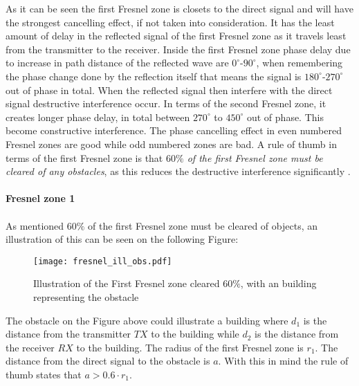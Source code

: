As it can be seen the first Fresnel zone is closets to the direct signal and will have the strongest cancelling effect, if not taken into consideration. It has the least amount of delay in the reflected signal of the first Fresnel zone as it travels least from the transmitter to the receiver. Inside the first Fresnel zone phase delay due to increase in path distance of the reflected wave are $0^\circ$-$90^\circ$, when remembering the phase change done by the reflection itself that means the signal is $180^\circ$-$270^\circ$ out of phase in total. When the reflected signal then interfere with the direct signal destructive interference occur. In terms of the second Fresnel zone, it creates longer phase delay, in total between $270^\circ$ to $450^\circ$ out of phase. This become constructive interference. The phase cancelling effect in even numbered Fresnel zones are good while odd numbered zones are bad. A rule of thumb in terms of the first Fresnel zone is that \textit{$60\%$ of the first Fresnel zone must be cleared of any obstacles}, as this reduces the destructive interference significantly \citep{introRF}\citep{Fres2}. 
\\
\\


\textbf{Fresnel zone 1}
\\
\\
As mentioned $60\%$ of the first Fresnel zone must be cleared of objects, an illustration of this can be seen on the following Figure:
\begin{figure}[H]
\centering
\texttt{[image: fresnel\_ill\_obs.pdf]}
\caption{Illustration of the First Fresnel zone cleared $60\%$, with an building representing the obstacle}
\label{dijdk1}
\end{figure}


The obstacle on the Figure above could illustrate a building where $d_{1}$ is the distance from the transmitter $TX$ to the building while $d_{2}$ is the distance from the receiver $RX$ to the building. The radius of the first Fresnel zone is $r_1$. The distance from the direct signal to the obstacle is $a$. 
With this in mind the rule of thumb states that $a > 0.6\cdot r_1$. 



